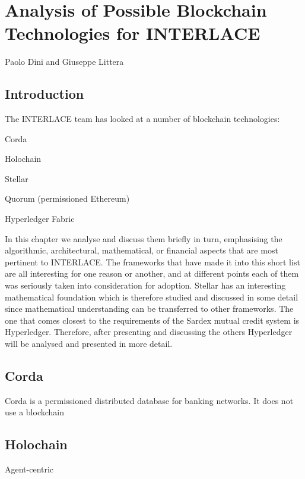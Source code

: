 \chapter{Analysis of Possible Blockchain Technologies for INTERLACE}
\label{ch:dlt}

\vspace{-1cm}
\begin{center}
Paolo Dini and Giuseppe Littera
\end{center}

\section{Introduction}
The INTERLACE team has looked at a number of blockchain technologies:
\begin{packed_item1}
\item Corda
\item Holochain
\item Stellar
\item Quorum (permissioned Ethereum)
\item Hyperledger Fabric
\end{packed_item1}
In this chapter we analyse and discuss them briefly in turn, emphasising the algorithmic, architectural,  mathematical, or financial aspects that are most pertinent to INTERLACE. The frameworks that have made it into this short list are all interesting for one reason or another, and at different points each of them was seriously taken into consideration for adoption. Stellar has an interesting mathematical foundation which is therefore studied and discussed in some detail since mathematical understanding can be transferred to other frameworks. The one that comes closest to the requirements of the Sardex mutual credit system is Hyperledger. Therefore, after presenting and discussing the others Hyperledger will be analysed and presented in more detail.


\section{Corda}
Corda \cite{Hearn2016} is a permissioned distributed database for banking networks. It does not use a blockchain



\section{Holochain}
Agent-centric
\cite{HarrisBrownEtAl2018}









